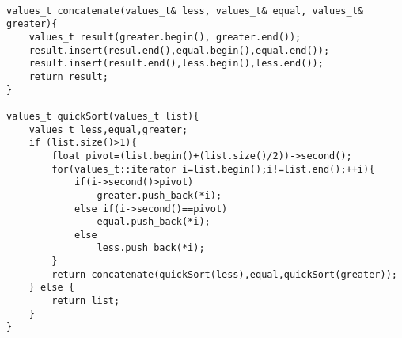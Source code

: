 \begin{lstlisting}

values_t concatenate(values_t& less, values_t& equal, values_t& greater){
	values_t result(greater.begin(), greater.end());
	result.insert(resul.end(),equal.begin(),equal.end());
	result.insert(result.end(),less.begin(),less.end());
	return result;
}

values_t quickSort(values_t list){
	values_t less,equal,greater;
	if (list.size()>1){
		float pivot=(list.begin()+(list.size()/2))->second();
		for(values_t::iterator i=list.begin();i!=list.end();++i){
			if(i->second()>pivot)
				greater.push_back(*i);
			else if(i->second()==pivot)
				equal.push_back(*i);
			else
				less.push_back(*i);
		}
		return concatenate(quickSort(less),equal,quickSort(greater));
	} else {
		return list;
	}
}
\end{lstlisting}